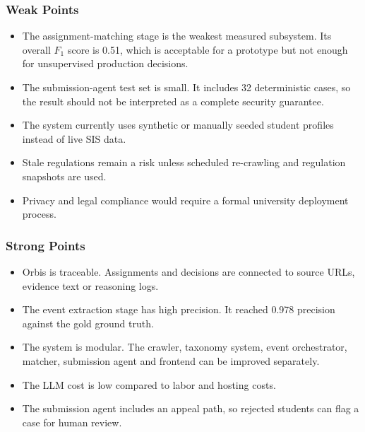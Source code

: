 \documentclass[a4paper,12pt]{article}
\begin{document}
\subsubsection{Weak Points}
\begin{itemize}
    \item The assignment-matching stage is the weakest measured subsystem. Its overall $F_1$ score is 0.51, which is acceptable for a prototype but not enough for unsupervised production decisions.
    \item The submission-agent test set is small. It includes 32 deterministic cases, so the result should not be interpreted as a complete security guarantee.
    \item The system currently uses synthetic or manually seeded student profiles instead of live SIS data.
    \item Stale regulations remain a risk unless scheduled re-crawling and regulation snapshots are used.
    \item Privacy and legal compliance would require a formal university deployment process.
\end{itemize}

\subsubsection{Strong Points}
\begin{itemize}
    \item Orbis is traceable. Assignments and decisions are connected to source URLs, evidence text or reasoning logs.
    \item The event extraction stage has high precision. It reached 0.978 precision against the gold ground truth.
    \item The system is modular. The crawler, taxonomy system, event orchestrator, matcher, submission agent and frontend can be improved separately.
    \item The LLM cost is low compared to labor and hosting costs.
    \item The submission agent includes an appeal path, so rejected students can flag a case for human review.
\end{itemize}
\end{document}
